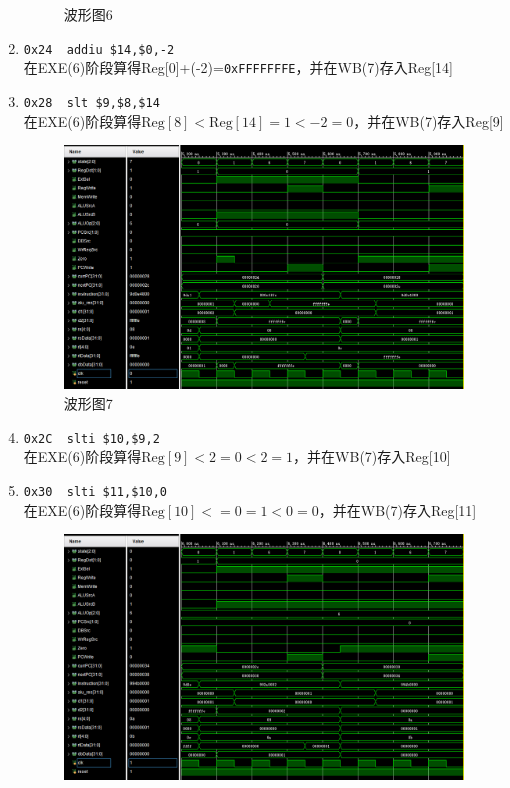 \begin{enumerate}
\begin{figure}[H]
\caption{波形图6}
\label{fig:wave_6}
\end{figure}
    \item \verb'0x24  addiu $14,$0,-2'\\
    在EXE(6)阶段算得Reg[0]+(-2)=\verb'0xFFFFFFFE'，并在WB(7)存入Reg[14]
    \item \verb'0x28  slt $9,$8,$14'\\
    在EXE(6)阶段算得$\mathrm{Reg}[8]<\mathrm{Reg}[14]=1<-2=0$，并在WB(7)存入Reg[9]
\begin{figure}[H]
\centering
\includegraphics[width=\linewidth]{fig/FullIns/Ins7.PNG}
\caption{波形图7}
\label{fig:wave_7}
\end{figure}
    \item \verb'0x2C  slti $10,$9,2'\\
    在EXE(6)阶段算得$\mathrm{Reg}[9]<2=0<2=1$，并在WB(7)存入Reg[10]
    \item \verb'0x30  slti $11,$10,0'\\
    在EXE(6)阶段算得$\mathrm{Reg}[10]<=0=1<0=0$，并在WB(7)存入Reg[11]
\begin{figure}[H]
\centering
\includegraphics[width=0.9\linewidth]{fig/FullIns/Ins8.PNG}

\end{figure}
\end{enumerate}
